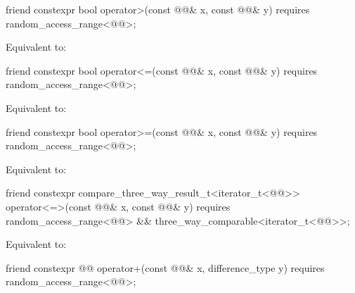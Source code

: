 %
\begin{itemdecl}
friend constexpr bool operator>(const @@& x, const @@& y)
  requires random_access_range<@@>;
\end{itemdecl}

\begin{itemdescr}
\pnum
\effects
Equivalent to: 
\end{itemdescr}

%
\begin{itemdecl}
friend constexpr bool operator<=(const @@& x, const @@& y)
  requires random_access_range<@@>;
\end{itemdecl}

\begin{itemdescr}
\pnum
\effects
Equivalent to: 
\end{itemdescr}

%
\begin{itemdecl}
friend constexpr bool operator>=(const @@& x, const @@& y)
  requires random_access_range<@@>;
\end{itemdecl}

\begin{itemdescr}
\pnum
\effects
Equivalent to: 
\end{itemdescr}

%
\begin{itemdecl}
friend constexpr compare_three_way_result_t<iterator_t<@@>>
  operator<=>(const @@& x, const @@& y)
    requires random_access_range<@@> && three_way_comparable<iterator_t<@@>>;
\end{itemdecl}

\begin{itemdescr}
\pnum
\effects
Equivalent to: 
\end{itemdescr}

%
\begin{itemdecl}
friend constexpr @@ operator+(const @@& x, difference_type y)
  requires random_access_range<@@>;
\end{itemdecl}

